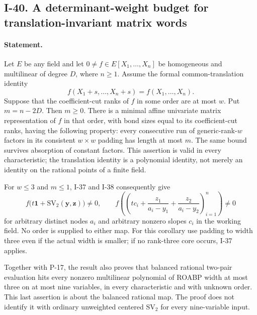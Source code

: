 \subsection{I-40. A determinant-weight budget for translation-invariant matrix words}
\label{I-40}

\paragraph{Statement.}
Let $E$ be any field and let $0\ne f\in E[X_1,\ldots,X_n]$ be
homogeneous and multilinear of degree $D$, where $n\ge1$.
Assume the formal common-translation identity
\[
 f(X_1+s,\ldots,X_n+s)=f(X_1,\ldots,X_n).
 \tag{I.119}
\]
Suppose that the coefficient-cut ranks of $f$ in some order are
at most $w$. Put $m=n-2D$. Then $m\ge0$.
There is a minimal affine univariate matrix representation of
$f$ in that order, with bond sizes equal to its coefficient-cut
ranks, having the following property: every consecutive run of
generic-rank-$w$ factors in its consistent $w\times w$ padding
has length at most $m$. The same bound survives absorption of
constant factors. This assertion is valid in every characteristic;
the translation identity is a polynomial identity, not merely an
identity on the rational points of a finite field.

For $w\le3$ and $m\le1$, I-37 and I-38 consequently give
\[
 f\bigl(t\mathbf1+\mathrm{SV}_2(\mathbf y,\mathbf z)\bigr)\ne0,
 \qquad
 f\left(\left(tc_i+\frac{z_1}{a_i-y_1}
                         +\frac{z_2}{a_i-y_2}\right)_{i=1}^n\right)\ne0
 \tag{I.120}
\]
for arbitrary distinct nodes $a_i$ and arbitrary nonzero slopes
$c_i$ in the working field. No order is supplied to either map.
For this corollary use padding to width three even if the actual
width is smaller; if no rank-three core occurs, I-37 applies.

Together with P-17, the result also proves that balanced rational
two-pair evaluation hits every nonzero multilinear polynomial
of ROABP width at most three on at most nine variables, in every
characteristic and with unknown order. This last assertion is
about the balanced rational map. The proof does not identify it
with ordinary unweighted centered $\mathrm{SV}_2$ for every
nine-variable input.

